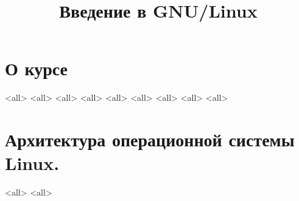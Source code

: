 

\title{Введение в GNU/Linux}




\begin{frame}
	\frametitle{}
	\titlepage
	\vspace{-0.5cm}
	\begin{center}
	\end{center}
\end{frame}


\begin{frame}
	\tableofcontents
	[hideallsubsections]
\end{frame}


\section{О курсе}

\mode<all>{}
\mode<all>{}
\mode<all>{}
\mode<all>{}
\mode<all>{}
\mode<all>{}
\mode<all>{}
\mode<all>{}
\mode<all>{}

\section{Архитектура операционной системы Linux. }

\mode<all>{}
\mode<all>{}

